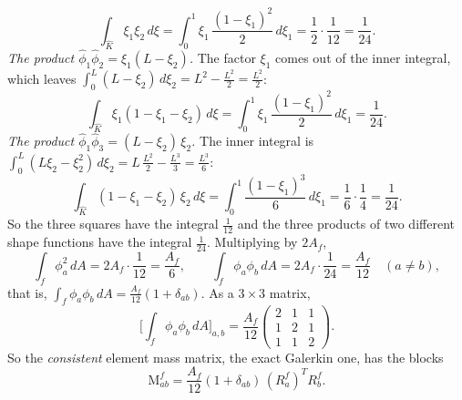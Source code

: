\begin{equation*}
\int_{\hat K} \xi_1\xi_2\, d\xi = \int_0^1 \xi_1\, \frac{(1-\xi_1)^2}{2}\, d\xi_1 = \frac12\cdot\frac{1}{12} = \frac{1}{24} .
\end{equation*}
\emph{The product $\hat\phi_1\hat\phi_2 = \xi_1(L - \xi_2)$.} The factor $\xi_1$ comes out of the inner integral, which leaves $\int_0^L (L - \xi_2)\, d\xi_2 = L^2 - \frac{L^2}{2} = \frac{L^2}{2}$:
\begin{equation*}
\int_{\hat K} \xi_1(1 - \xi_1 - \xi_2)\, d\xi = \int_0^1 \xi_1\, \frac{(1-\xi_1)^2}{2}\, d\xi_1 = \frac{1}{24} .
\end{equation*}
\emph{The product $\hat\phi_1\hat\phi_3 = (L - \xi_2)\,\xi_2$.} The inner integral is $\int_0^L (L\xi_2 - \xi_2^2)\, d\xi_2 = L\,\frac{L^2}{2} - \frac{L^3}{3} = \frac{L^3}{6}$:
\begin{equation*}
\int_{\hat K} (1 - \xi_1 - \xi_2)\,\xi_2\, d\xi = \int_0^1 \frac{(1 - \xi_1)^3}{6}\, d\xi_1 = \frac16\cdot\frac14 = \frac{1}{24} .
\end{equation*}
So the three squares have the integral $\frac{1}{12}$ and the three products of two different shape functions have the integral $\frac{1}{24}$. Multiplying by $2A_f$,
\begin{equation*}
\int_f\phi_a^2\, dA = 2A_f\cdot\frac{1}{12} = \frac{A_f}{6}, \qquad \int_f\phi_a\phi_b\, dA = 2A_f\cdot\frac{1}{24} = \frac{A_f}{12} \quad (a\ne b),
\end{equation*}
that is, $\int_f \phi_a \phi_b\, dA = \frac{A_f}{12} (1 + \delta_{ab})$. As a $3\times 3$ matrix,
\begin{equation*}
\Big[\int_f \phi_a\phi_b\, dA\Big]_{a,b} = \frac{A_f}{12}\begin{pmatrix} 2 & 1 & 1 \\ 1 & 2 & 1 \\ 1 & 1 & 2\end{pmatrix} .
\end{equation*}
So the \emph{consistent} element mass matrix, the exact Galerkin one, has the blocks
\begin{equation}
\label{eqn:consistent_mass}
\mathrm M^f_{ab} = \frac{A_f}{12} (1 + \delta_{ab})\, (R_a^f)^T R_b^f .
\end{equation}


